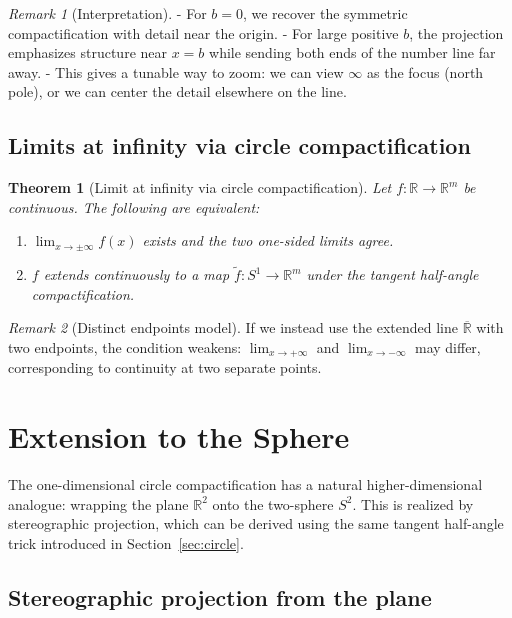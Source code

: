 \documentclass[12pt]{article}
\newtheorem{theorem}{Theorem}
\theoremstyle{remark}
\newtheorem*{remark}{Remark}
\begin{document}
\begin{remark}[Interpretation]
- For $b=0$, we recover the symmetric compactification with detail near the origin.  
- For large positive $b$, the projection emphasizes structure near $x=b$ while 
sending both ends of the number line far away.  
- This gives a tunable way to zoom: we can view $\infty$ as the focus (north pole), 
or we can center the detail elsewhere on the line.  
\end{remark}

\subsection{Limits at infinity via circle compactification}
\begin{theorem}[Limit at infinity via circle compactification]\label{thm:RtoS1}
Let $f:\mathbb{R}\to\mathbb{R}^m$ be continuous. The following are equivalent:
\begin{enumerate}
    \item $\lim_{x\to\pm\infty} f(x)$ exists and the two one-sided limits agree.  
    \item $f$ extends continuously to a map $\tilde f:S^1\to\mathbb{R}^m$ under 
    the tangent half-angle compactification.  
\end{enumerate}
\end{theorem}

\begin{remark}[Distinct endpoints model]
If we instead use the extended line $\overline{\mathbb{R}}$ with two endpoints, 
the condition weakens: $\lim_{x\to +\infty}$ and $\lim_{x\to -\infty}$ may differ, 
corresponding to continuity at two separate points.  
\end{remark}

\section{Extension to the Sphere}
\label{sec:sphere}

The one-dimensional circle compactification has a natural higher-dimensional 
analogue: wrapping the plane $\mathbb{R}^2$ onto the two-sphere $S^2$. 
This is realized by stereographic projection, which can be derived using 
the same tangent half-angle trick introduced in Section~\ref{sec:circle}.

\subsection{Stereographic projection from the plane}
\end{document}
